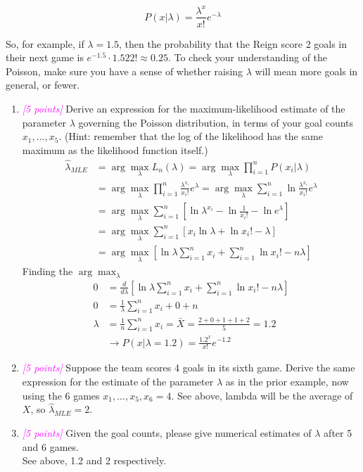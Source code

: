 \documentclass{article}
\newcommand{\argmax}{\arg\!\max}
\newcommand{\1}{\mathbf{1}}
\newcommand{\points}[1]{\small\textcolor{magenta}{\emph{[#1 points]}} \normalsize}
\begin{document}
$$P(x|\lambda)=\frac{\lambda^x}{x!}e^{-\lambda}$$

So, for example, if $\lambda=1.5$, then the probability that the Reign score 2 goals in their next game is $e^{-1.5}\cdot1.522!\approx0.25$. To check your understanding of the Poisson, make sure you have a sense of whether raising $\lambda$ will mean more goals in general, or fewer. 
\begin{enumerate}
	\item \points{5} Derive an expression for the maximum-likelihood estimate of the parameter $\lambda$ governing the Poisson distribution, in terms of your goal counts $x_1,...,x_5$. (Hint: remember that the log of the likelihood has the same maximum as the likelihood function itself.) \newline
	\begin{align*}
	    \widehat \lambda_{MLE} &= \argmax_\lambda L_n(\lambda) = \argmax_\lambda \prod_{i=1}^n P(x_i|\lambda) \\
	    &= \argmax_\lambda\prod_{i=1}^n \frac{\lambda^{x_i}}{x_i!}e^\lambda = \argmax_\lambda\sum_{i=1}^n \ln{\frac{\lambda^{x_i}}{x_i!}e^\lambda} \\
	    &= \argmax_\lambda\sum_{i=1}^n \left[\ln\lambda^{x_i} - \ln\frac{1}{x_i!} - \ln e^\lambda\right] \\
	    &= \argmax_\lambda\sum_{i=1}^n \left[x_i\ln\lambda + \ln x_i! - \lambda\right] \\
	    &= \argmax_\lambda \left[\ln\lambda\sum_{i=1}^n x_i + \sum_{i=1}^n\ln x_i! - n\lambda\right]
	\end{align*}
	Finding the $\argmax_\lambda$ 
	\begin{align*}
	    0 &= \frac{d}{d\lambda} \left[\ln\lambda\sum_{i=1}^n x_i + \sum_{i=1}^n\ln x_i! - n\lambda\right] \\
	    0 &= \frac{1}{\lambda}\sum_{i=1}^n x_i + 0 + n \\
	    \lambda &= \frac{1}{n}\sum_{i=1}^n x_i = \bar X = \frac{2+0+1+1+2}{5} = 1.2 \\
	    &\rightarrow P(x|\lambda=1.2)=\frac{1.2^x}{x!}e^{-1.2}
	\end{align*}
	
	\item \points{5} Suppose the team scores 4 goals in its sixth game.  Derive the same expression for the estimate of the parameter $\lambda$ as in the prior example, now using the 6 games $x_1,...,x_5,x_6=4$. \newline
	See above, lambda will be the average of $X$, so $\widehat \lambda_{MLE}=2$.
	
	\item\points{5} Given the goal counts, please give numerical estimates of $\lambda$ after 5 and 6 games. \\
	See above, 1.2 and 2 respectively.
\end{enumerate}
\end{document}
